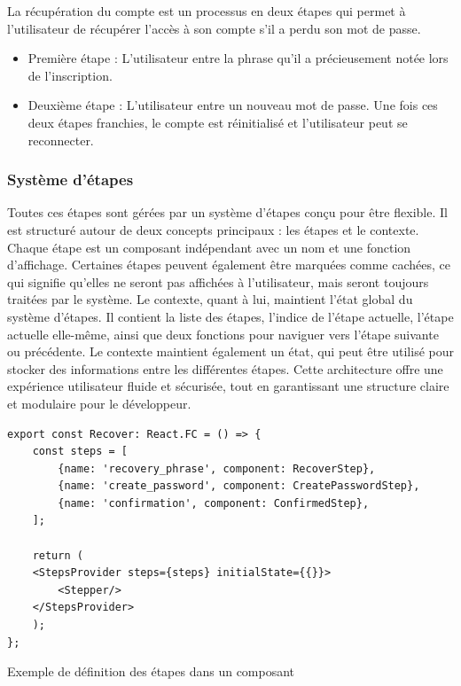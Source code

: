 La récupération du compte est un processus en deux étapes qui permet à l'utilisateur de récupérer l'accès à son compte s'il a perdu son mot de passe.

\begin{itemize}
    \item Première étape : L'utilisateur entre la phrase qu'il a précieusement notée lors de l'inscription.
    \item Deuxième étape : L'utilisateur entre un nouveau mot de passe. Une fois ces deux étapes franchies, le compte est réinitialisé et l'utilisateur peut se reconnecter.
\end{itemize}

\subsubsection{Système d'étapes}
Toutes ces étapes sont gérées par un système d'étapes conçu pour être flexible. Il est structuré autour de deux concepts principaux : les étapes et le contexte. Chaque étape est un composant indépendant avec un nom et une fonction d'affichage. Certaines étapes peuvent également être marquées comme \guillemotleft cachées\guillemotright, ce qui signifie qu'elles ne seront pas affichées à l'utilisateur, mais seront toujours traitées par le système. Le contexte, quant à lui, maintient l'état global du système d'étapes. Il contient la liste des étapes, l'indice de l'étape actuelle, l'étape actuelle elle-même, ainsi que deux fonctions pour naviguer vers l'étape suivante ou précédente. Le contexte maintient également un état, qui peut être utilisé pour stocker des informations entre les différentes étapes. Cette architecture offre une expérience utilisateur fluide et sécurisée, tout en garantissant une structure claire et modulaire pour le développeur.

\begin{listing}[H]
    \begin{verbatim}
export const Recover: React.FC = () => {
    const steps = [
        {name: 'recovery_phrase', component: RecoverStep},
        {name: 'create_password', component: CreatePasswordStep},
        {name: 'confirmation', component: ConfirmedStep},
    ];

    return (
    <StepsProvider steps={steps} initialState={{}}>
        <Stepper/>
    </StepsProvider>
    );
};
  \end{verbatim}
    \caption{Exemple de définition des étapes dans un composant}
\end{listing}


